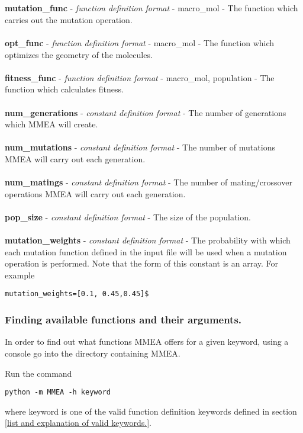 \documentclass{article}
\begin{document}
\\
\\
\textbf{mutation\_func} - \textit{function definition format} - macro\_mol - The function which carries out the mutation operation.
\\
\\
\textbf{opt\_func} - \textit{function definition format} - macro\_mol - The function which optimizes the geometry of the molecules.
\\
\\
\textbf{fitness\_func} - \textit{function definition format} - macro\_mol, population - The function which calculates fitness.
\\
\\
\textbf{num\_generations} - \textit{constant definition format} - The number of generations which MMEA will create.
\\
\\
\textbf{num\_mutations} - \textit{constant definition format} - The number of mutations MMEA will carry out each generation.
\\
\\
\textbf{num\_matings} - \textit{constant definition format} - The number of mating/crossover operations MMEA will carry out each generation.
\\
\\
\textbf{pop\_size} - \textit{constant definition format} - The size of the population.
\\
\\
\textbf{mutation\_weights} - \textit{constant definition format} - The probability with which each mutation function defined in the input file will be used when a mutation operation is performed. Note that the form of this constant is an array. For example
\begin{verbatim}
mutation_weights=[0.1, 0.45,0.45]$
\end{verbatim}

\subsubsection{Finding available functions and their arguments.}
In order to find out what functions MMEA offers for a given keyword, using a console go into the directory containing MMEA. 

Run the command 
\begin{verbatim}
python -m MMEA -h keyword
\end{verbatim}
where keyword is one of the valid function definition keywords defined in section \ref{list and explanation of valid keywords.}.
\end{document}
